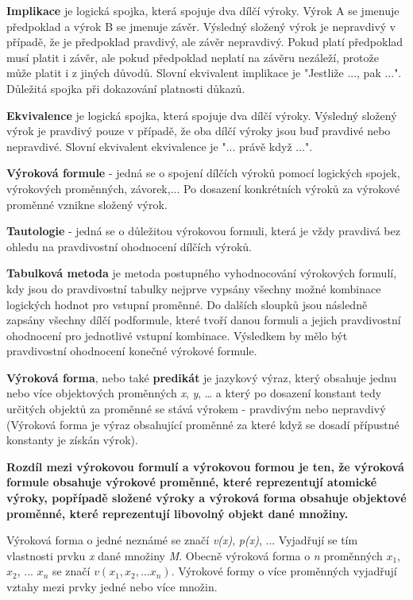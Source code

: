{\bf Implikace} je logická spojka, která spojuje dva dílčí výroky. Výrok A se jmenuje předpoklad a výrok B se jmenuje závěr. Výsledný složený výrok je nepravdivý v případě, že je předpoklad pravdivý, ale závěr nepravdivý. Pokud platí předpoklad musí platit i závěr, ale pokud předpoklad
neplatí na závěru nezáleží, protože může platit i z jiných důvodů. Slovní ekvivalent implikace je "Jestliže ..., pak ...". Důležitá spojka při dokazování platnosti důkazů.

{\bf Ekvivalence} je logická spojka, která spojuje dva dílčí výroky. Výsledný složený výrok je pravdivý pouze v případě, že oba dílčí výroky jsou buď pravdivé nebo nepravdivé. Slovní ekvivalent ekvivalence je "... právě když ...".

{\bf Výroková formule} - jedná se o spojení dílčích výroků pomocí logických spojek, výrokových proměnných, závorek,... Po dosazení konkrétních výroků za výrokové proměnné vznikne složený výrok.

{\bf Tautologie} - jedná se o důležitou výrokovou formuli, která je vždy pravdivá bez ohledu na pravdivostní ohodnocení dílčích výroků.

{\bf Tabulková metoda} je metoda postupného vyhodnocování výrokových formulí, kdy jsou do pravdivostní tabulky nejprve vypsány všechny možné kombinace logických hodnot pro vstupní proměnné. Do dalších sloupků jsou následně zapsány všechny dílčí podformule, které tvoří danou formuli a jejich pravdivostní ohodnocení pro jednotlivé vstupní kombinace. Výsledkem by mělo být pravdivostní ohodnocení konečné výrokové formule.


{\bf Výroková forma}, nebo také {\bf predikát} je jazykový výraz, který obsahuje jednu nebo více objektových proměnných {\it x}, {\it y}, … a který po dosazení konstant tedy určitých objektů za proměnné se stává výrokem - pravdivým nebo nepravdivý (Výroková forma je výraz obsahující proměnné za které když se dosadí přípustné konstanty je získán výrok).

{\bf
Rozdíl mezi výrokovou formulí a výrokovou formou je ten, že výroková formule obsahuje výrokové proměnné, které reprezentují atomické výroky, popřípadě složené výroky a výroková forma obsahuje objektové proměnné, které reprezentují libovolný objekt dané množiny.
}

Výroková forma o jedné neznámé se značí {\it v(x)}, {\it p(x)}, ... Vyjadřují se tím vlastnosti prvku {\it x} dané množiny {\it M}. Obecně výroková forma o {\it n} proměnných   $x_1$,  $x_2$, ... $x_n$ se značí $v(x_1, x_2, ... x_n)$. Výrokové formy o více proměnných vyjadřují vztahy mezi prvky jedné nebo více množin. 


